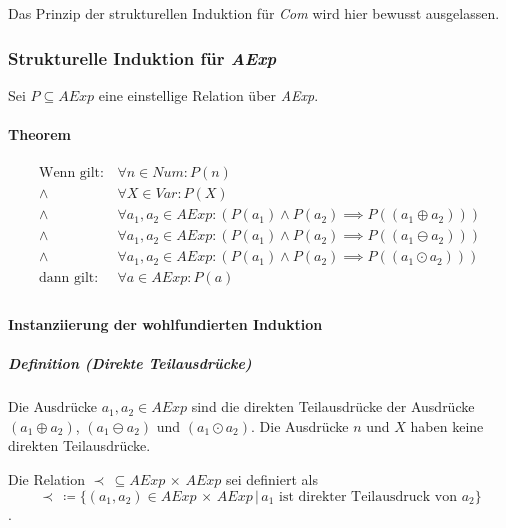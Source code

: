 \documentclass[a4paper, 11pt, accentcolor = tud3b]{tudreport}
\newcommand{\forwhich}{\ensuremath{{\,\vert\,}}}
\newcommand{\definition}[2]{\subparagraph{Definition (#1)} #2}
\begin{document}
					Das Prinzip der strukturellen Induktion für \textit{Com} wird hier bewusst ausgelassen.
			    
			    \subsubsection{Strukturelle Induktion für \textit{AExp}}
				    Sei $ P \subseteq \textit{AExp} $ eine einstellige Relation über \textit{AExp}.
				    
				    \paragraph{Theorem}
					    \begin{align*}
						    \text{Wenn gilt:} & \,\forall n \in \textit{Num} : P(n) \\
							\land & \,\forall X \in \textit{Var} : P(X) \\
							\land & \,\forall a _ 1, a _ 2 \in \textit{AExp} : (P(a _ 1) \land P(a _ 2) \implies P((a _ 1 \oplus a _ 2))) \\
							\land & \,\forall a _ 1, a _ 2 \in \textit{AExp} : (P(a _ 1) \land P(a _ 2) \implies P((a _ 1 \ominus a _ 2))) \\
							\land & \,\forall a _ 1, a _ 2 \in \textit{AExp} : (P(a _ 1) \land P(a _ 2) \implies P((a _ 1 \odot a _ 2))) \\
							\text{dann gilt:} & \,\forall a \in \textit{AExp} : P(a) \\
					    \end{align*}
				    
				    \paragraph{Instanziierung der wohlfundierten Induktion}
					    \definition{Direkte Teilausdrücke}{Die Ausdrücke $ a _ 1, a _ 2 \in \textit{AExp} $ sind die direkten Teilausdrücke der Ausdrücke $ (a _ 1 \oplus a _ 2) $, $ (a _ 1 \ominus a _ 2) $ und $ (a _ 1 \odot a _ 2) $. Die Ausdrücke $ n $ und $ X $ haben keine direkten Teilausdrücke.}

					    Die Relation $ \prec \,\subseteq \textit{AExp} \,\times\, \textit{AExp} $ sei definiert als \[ \prec \,\coloneqq \{ (a _ 1, a _ 2) \in \textit{AExp} \,\times\, \textit{AExp} \forwhich a _ 1 \text{ ist direkter Teilausdruck von } a _ 2 \} \].
					    
\end{document}
